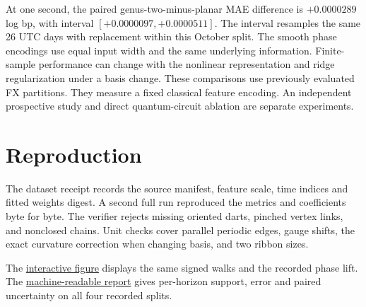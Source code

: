 \documentclass[11pt]{article}
\begin{document}
\begin{table}[h]
\centering
\caption{October mean absolute error in log bp.}

\end{table}

At one second, the paired genus-two-minus-planar MAE difference is $+0.0000289$ log bp, with interval $[+0.0000097,+0.0000511]$. The interval resamples the same 26 UTC days with replacement within this October split. The smooth phase encodings use equal input width and the same underlying information. Finite-sample performance can change with the nonlinear representation and ridge regularization under a basis change. These comparisons use previously evaluated FX partitions. They measure a fixed classical feature encoding. An independent prospective study and direct quantum-circuit ablation are separate experiments.

\section{Reproduction}
The dataset receipt records the source manifest, feature scale, time indices and fitted weights digest. A second full run reproduced the metrics and coefficients byte for byte. The verifier rejects missing oriented darts, pinched vertex links, and nonclosed chains. Unit checks cover parallel periodic edges, gauge shifts, the exact curvature correction when changing basis, and two ribbon sizes.

The \href{https://amelie-iska.github.io/phaseweave-lab/ribbon.html}{interactive figure} displays the same signed walks and the recorded phase lift. The \href{https://amelie-iska.github.io/phaseweave-lab/ribbon-fx-results-v1.json}{machine-readable report} gives per-horizon support, error and paired uncertainty on all four recorded splits.
\end{document}
